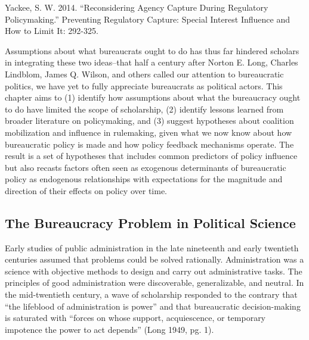Yackee, S. W.  2014.  ``Reconsidering Agency Capture During Regulatory Policymaking.''  Preventing Regulatory Capture: Special Interest Influence and How to Limit It: 292-325.








Assumptions about what bureaucrats ought to do has thus far hindered scholars in integrating these two ideas--that half a century after Norton E. Long, Charles Lindblom, James Q. Wilson, and others called our attention to bureaucratic politics, we have yet to fully appreciate bureaucrats as political actors. This chapter aims to (1) identify how assumptions about what the bureaucracy ought to do have limited the scope of scholarship, (2) identify lessons learned from broader literature on policymaking, and (3) suggest hypotheses about coalition mobilization and influence in rulemaking, given what we now know about how bureaucratic policy is made and how policy feedback mechanisms operate. %
The result is a set of hypotheses that includes common predictors of policy influence but also recasts factors often seen as exogenous determinants of bureaucratic policy as endogenous relationships with expectations for the magnitude and direction of their effects on policy over time. 



\subsection{The Bureaucracy Problem in Political Science}

Early studies of public administration in the late nineteenth and early twentieth centuries assumed that problems could be solved rationally. Administration was a science with objective methods to design and carry out administrative tasks. The principles of good administration were discoverable, generalizable, and neutral. In the mid-twentieth century, a wave of scholarship responded to the contrary that ``the lifeblood of administration is power'' and that bureaucratic decision-making is saturated with ``forces on whose support, acquiescence, or temporary impotence the power to act depends'' (Long 1949, pg. 1). 


